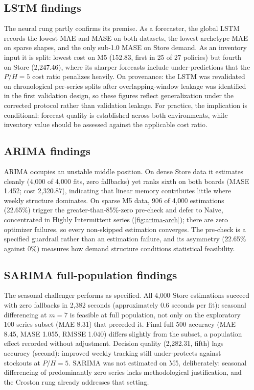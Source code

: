 \subsection{LSTM findings}
\label{sec:lstm-find}
The neural rung partly confirms its premise. As a forecaster, the global LSTM
records the lowest MAE and MASE on both datasets, the lowest archetype MAE on
sparse shapes, and the only sub-1.0 MASE on Store demand. As an inventory
input it is split: lowest cost on M5 (152.83, first in 25 of 27 policies) but
fourth on Store (2,247.46), where its sharper forecasts include
under-predictions that the $P/H=5$ cost ratio penalizes heavily. On
provenance: the LSTM was revalidated on chronological per-series splits after
overlapping-window leakage was identified in the first validation design, so
these figures reflect generalization under the corrected protocol rather than
validation leakage. For practice, the implication is conditional: forecast
quality is established across both environments, while inventory value should
be assessed against the applicable cost ratio.

\subsection{ARIMA findings}
\label{sec:arima-find}
ARIMA occupies an unstable middle position. On dense Store data it estimates
cleanly (4,000 of 4,000 fits, zero fallbacks) yet ranks sixth on both boards
(MASE 1.452; cost 2,320.87), indicating that linear memory contributes little
where weekly structure dominates. On sparse M5 data, 906 of 4,000 estimations
(22.65\%) trigger the greater-than-85\%-zero pre-check and defer to Naive,
concentrated in Highly Intermittent series (\cref{fig:arima-arch}); there are
zero optimizer failures, so every non-skipped estimation converges. The
pre-check is a specified guardrail rather than an estimation failure, and its
asymmetry (22.65\% against 0\%) measures how demand structure conditions
statistical feasibility.

\subsection{SARIMA full-population findings}
\label{sec:sarima-find}
The seasonal challenger performs as specified. All 4,000 Store estimations
succeed with zero fallbacks in 2,382 seconds (approximately 0.6 seconds per
fit): seasonal differencing at $m=7$ is feasible at full population, not only
on the exploratory 100-series subset (MAE 8.31) that preceded it. Final
full-500 accuracy (MAE 8.45, MASE 1.055, RMSSE 1.040) differs slightly from
the subset, a population effect recorded without adjustment. Decision quality
(2,282.31, fifth) lags accuracy (second): improved weekly tracking still
under-protects against stockouts at $P/H=5$. SARIMA was not estimated on M5,
deliberately: seasonal differencing of predominantly zero series lacks
methodological justification, and the Croston rung already addresses that
setting.

